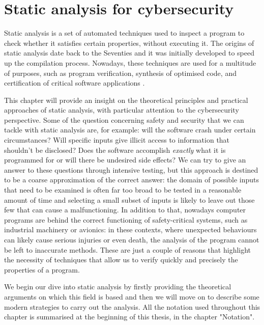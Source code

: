 \documentclass[12pt,a4paper]{book}
\theoremstyle{definition}
\begin{document}
	\chapter{Static analysis for cybersecurity}\label{chapter:static_analysis}
	Static analysis is a set of automated techniques used to inspect a program to check whether it satisfies certain properties, without executing it. The origins of static analysis date back to the Seventies and it was initially developed to speed up the compilation process. Nowadays, these techniques are used for a multitude of purposes, such as program verification, synthesis of optimised code, and certification of critical software applications \cite{Rival2020}. 
	
	This chapter will provide an insight on the theoretical principles and practical approaches of static analysis, with particular attention to the cybersecurity perspective. Some of the question concerning safety and security that we can tackle with static analysis are, for example: will the software crash under certain circumstances? Will specific inputs give illicit access to information that shouldn't be disclosed? Does the software accomplish \textit{exactly} what it is programmed for or will there be undesired side effects? We can try to give an answer to these questions through intensive testing, but this approach is destined to be a coarse approximation of the correct answer: the domain of possible inputs that need to be examined is often far too broad to be tested in a reasonable amount of time and selecting a small subset of inputs is likely to leave out those few that can cause a malfunctioning. In addition to that, nowadays computer programs are behind the correct functioning of safety-critical systems, such as industrial machinery or avionics: in these contexts, where unexpected behaviours can likely cause serious injuries or even death, the analysis of the program cannot be left to inaccurate methods. These are just a couple of reasons that highlight the necessity of techniques that allow us to verify quickly and precisely the properties of a program.
	
	We begin our dive into static analysis by firstly providing the theoretical arguments on which this field is based and then we will move on to describe some modern strategies to carry out the analysis. All the notation used throughout this chapter is summarised at the beginning of this thesis, in the chapter "Notation".
\end{document}

